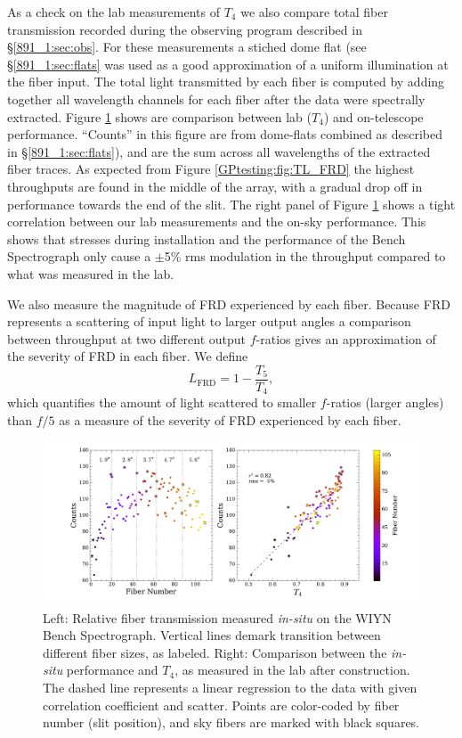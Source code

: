 As a check on the lab measurements of $T_4$ we also compare total
fiber transmission recorded during the observing program described in
\S\ref{891_1:sec:obs}. For these measurements a stiched dome flat (see
\S\ref{891_1:sec:flats} was used as a good approximation of a uniform
illumination at the fiber input. The total light transmitted by each
fiber is computed by adding together all wavelength channels for each
fiber after the data were spectrally extracted. Figure
\ref{GPtesting:fig:count_tput} shows are comparison between lab
($T_4$) and on-telescope performance. ``Counts'' in this figure are
from dome-flats combined as described in \S\ref{891_1:sec:flats}), and
are the sum across all wavelengths of the extracted fiber traces.  As
expected from Figure \ref{GPtesting:fig:TL_FRD} the highest
throughputs are found in the middle of the array, with a gradual drop
off in performance towards the end of the slit. The right panel of
Figure \ref{GPtesting:fig:count_tput} shows a tight correlation
between our lab measurements and the on-sky performance. This shows
that stresses during installation and the performance of the Bench
Spectrograph only cause a $\pm$5\% rms modulation in the throughput
compared to what was measured in the lab.

We also measure the magnitude of FRD experienced by each
fiber. Because FRD represents a scattering of input light to larger
output angles a comparison between throughput at two different output
$f$-ratios gives an approximation of the severity of FRD in each
fiber. We define
\begin{equation}
\label{GPtesting:eq:L_FRD}
  L_\mathrm{FRD} = 1 - \frac{T_5}{T_4},
\end{equation}
which quantifies the amount of light scattered to smaller $f$-ratios
(larger angles) than $f/5$ as a measure of the severity of FRD
experienced by each fiber.

\begin{figure}
  \centering
  \includegraphics[width=\textwidth]{Appendix/figs/gradpak_count_plots.pdf}
  \caption[\GP on-bench throughput
  performance]{\label{GPtesting:fig:count_tput}\fixspacing Left:
    Relative fiber
    transmission measured \emph{in-situ} on the WIYN Bench
    Spectrograph. Vertical lines demark transition between different
    fiber sizes, as labeled. Right: Comparison between the
    \emph{in-situ} performance and $T_4$, as measured in the lab after
    construction. The dashed line represents a linear regression to
    the data with given correlation coefficient and scatter. Points
    are color-coded by fiber number (slit position), and sky fibers
    are marked with black squares.}
\end{figure}

